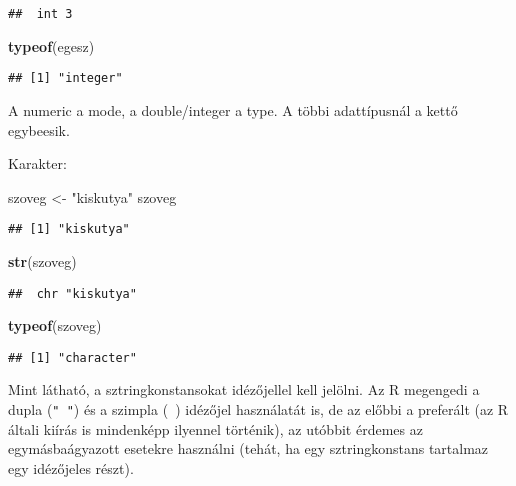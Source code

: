 \documentclass[]{book}
\newenvironment{Shaded}{\begin{snugshade}}{\end{snugshade}}
\newcommand{\KeywordTok}[1]{\textcolor[rgb]{0.13,0.29,0.53}{\textbf{#1}}}
\newcommand{\StringTok}[1]{\textcolor[rgb]{0.31,0.60,0.02}{#1}}
\newcommand{\NormalTok}[1]{#1}
\begin{document}
\begin{verbatim}
##  int 3
\end{verbatim}

\begin{Shaded}
\begin{Highlighting}[]
\KeywordTok{typeof}\NormalTok{(egesz)}
\end{Highlighting}
\end{Shaded}

\begin{verbatim}
## [1] "integer"
\end{verbatim}

A numeric a mode, a double/integer a type. A többi adattípusnál a kettő
egybeesik.

Karakter:

\begin{Shaded}
\begin{Highlighting}[]
\NormalTok{szoveg <-}\StringTok{ "kiskutya"}
\NormalTok{szoveg}
\end{Highlighting}
\end{Shaded}

\begin{verbatim}
## [1] "kiskutya"
\end{verbatim}

\begin{Shaded}
\begin{Highlighting}[]
\KeywordTok{str}\NormalTok{(szoveg)}
\end{Highlighting}
\end{Shaded}

\begin{verbatim}
##  chr "kiskutya"
\end{verbatim}

\begin{Shaded}
\begin{Highlighting}[]
\KeywordTok{typeof}\NormalTok{(szoveg)}
\end{Highlighting}
\end{Shaded}

\begin{verbatim}
## [1] "character"
\end{verbatim}

Mint látható, a sztringkonstansokat idézőjellel kell jelölni. Az R
megengedi a dupla (\texttt{"\ "}) és a szimpla
(\texttt{\textquotesingle{}\ \textquotesingle{}}) idézőjel használatát
is, de az előbbi a preferált (az R általi kiírás is mindenképp ilyennel
történik), az utóbbit érdemes az egymásbaágyazott esetekre használni
(tehát, ha egy sztringkonstans tartalmaz egy idézőjeles részt).
\end{document}
